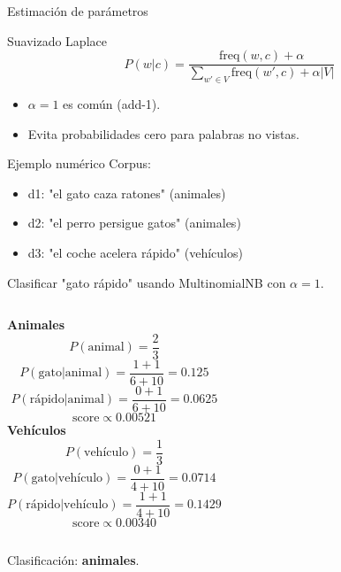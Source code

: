 \documentclass[aspectratio=169, 10pt, xcolor=table]{beamer}
\begin{document}
\begin{frame}{Estimación de parámetros}
    \begin{block}{Suavizado Laplace}
        \[
        P(w|c) = \frac{\text{freq}(w,c) + \alpha}{\sum_{w'\in V} \text{freq}(w',c) + \alpha |V|}
        \]
        \begin{itemize}
            \item $\alpha = 1$ es común (add-1).
            \item Evita probabilidades cero para palabras no vistas.
        \end{itemize}
    \end{block}
\end{frame}

\begin{frame}{Ejemplo numérico}
    Corpus:
    \begin{itemize}
        \item d1: "el gato caza ratones" (animales)
        \item d2: "el perro persigue gatos" (animales)
        \item d3: "el coche acelera rápido" (vehículos)
    \end{itemize}
    Clasificar "gato rápido" usando MultinomialNB con $\alpha=1$.
    \vspace{0.3cm}
    \begin{columns}[t]
        \textbf{Animales}
        \[
        P(\text{animal}) = \frac{2}{3}
        \]
        \[
        P(\text{gato}|\text{animal}) = \frac{1+1}{6+10} = 0.125
        \]
        \[
        P(\text{rápido}|\text{animal}) = \frac{0+1}{6+10} = 0.0625
        \]
        \[
        \text{score} \propto 0.00521
        \]
        \textbf{Vehículos}
        \[
        P(\text{vehículo}) = \frac{1}{3}
        \]
        \[
        P(\text{gato}|\text{vehículo}) = \frac{0+1}{4+10} = 0.0714
        \]
        \[
        P(\text{rápido}|\text{vehículo}) = \frac{1+1}{4+10} = 0.1429
        \]
        \[
        \text{score} \propto 0.00340
        \]
    \end{columns}
    Clasificación: \textbf{animales}.
\end{frame}
\end{document}
